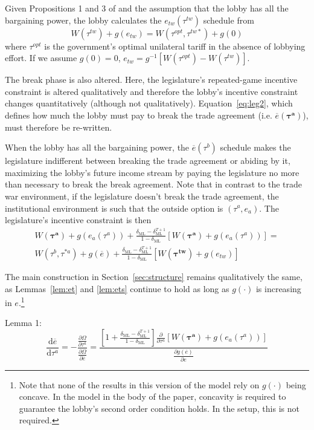 \documentclass[authoryear, review]{elsarticle}
\newcommand{\ov}{\overline}
\newcommand{\bta}{\bm{\tau^a}}
\newcommand{\btw}{\bm{\tau^{tw}}}
\newcommand{\de}{\delta}
\begin{document}
Given Propositions 1 and 3 of \citet{dgh97} and the assumption that the lobby has all the bargaining power, the lobby calculates the $e_{tw}\left(\tau^{tw}\right)$ schedule from 
\begin{equation}
  W(\tau^{tw}) +g(e_{tw}) = W(\tau^{opt},\tau^{tw*}) +g(0)
	\label{eq:dgh}
\end{equation}
where $\tau^{opt}$ is the government's optimal unilateral tariff in the absence of lobbying effort. If we assume $g(0) = 0$, $e_{tw} = g^{-1}\left[W(\tau^{opt}) - W(\tau^{tw})\right]$.
								
The break phase is also altered. Here, the legislature's repeated-game incentive constraint is altered qualitatively and therefore the lobby's incentive constraint changes quantitatively (although not qualitatively). Equation~\ref{eq:leg2}, which defines how much the lobby must pay to break the trade agreement (i.e. $\ov{e}(\bta)$), must therefore be re-written.

When the lobby has all the bargaining power, the $\ov{e}(\tau^b)$ schedule makes the legislature indifferent between breaking the trade agreement or abiding by it, maximizing the lobby's future income stream by paying the legislature no more than necessary to break the break agreement. Note that in contrast to the trade war environment, if the legislature doesn't break the trade agreement, the institutional environment is such that the outside option is $\left(\tau^a,e_a\right)$. The legislature's incentive constraint is then
	\begin{multline}
		W(\bta) + g(e_a(\tau^a)) + \frac{\de_\text{ML} - \de_\text{ML}^{T+1}}{1-\de_\text{ML}}\left[W(\bta) + g(e_a(\tau^a))\right] = \\
	W(\tau^b,\tau^{*a}) +g(\ov{e}) + \frac{\de_\text{ML} - \de_\text{ML}^{T+1}}{1-\de_\text{ML}} \left[W(\btw) + g(e_{tw})\right]
		\label{eq:newleg}
	\end{multline}
					
The main construction in Section~\ref{sec:structure} remains qualitatively the same, as Lemmas~\ref{lem:et} and \ref{lem:ets} continue to hold as long as $g(\cdot)$ is increasing in $e$.\footnote{Note that none of the results in this version of the model rely on $g(\cdot)$ being concave. In the model in the body of the paper, concavity is required to guarantee the lobby's second order condition holds. In the \citet{dgh97} setup, this is not required.} 
					
Lemma 1:
	\begin{equation*}
		\frac{\mathrm{d} \ov{e}}{\mathrm{d} \tau^a} = -\frac{\frac{\partial \Omega}{\partial \tau^a}}{\frac{\partial \Omega}{\partial \ov{e}}} =
	\textstyle \frac{\left[1+ \frac{\de_\text{ML} - \de_\text{ML}^{T+1}}{1-\de_\text{ML}}  \right]\frac{\partial}{\partial \tau^a}\left[W(\bta) + g(e_a(\tau^a))\right]}{\frac{\partial g(\ov{e})}{\partial e} }
  \end{equation*}
							
\end{document}
